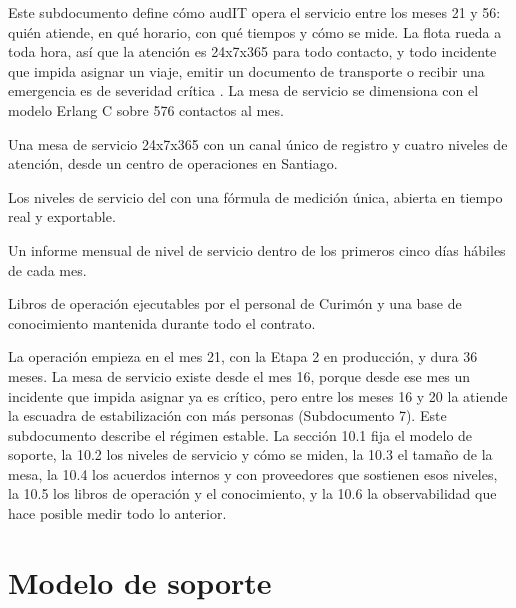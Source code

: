 
\begin{resumenApertura}
Este subdocumento define cómo audIT opera el servicio entre los meses 21 y 56: quién atiende, en qué
horario, con qué tiempos y cómo se mide. La flota rueda a toda hora, así que la atención es 24x7x365
para todo contacto, y todo incidente que impida asignar un viaje, emitir un documento de transporte o
recibir una emergencia es de severidad crítica . La mesa de servicio se dimensiona
con el modelo Erlang C sobre 576 contactos al mes.
\begin{recibe}
  \item Una mesa de servicio 24x7x365 con un canal único de registro y cuatro niveles de atención, desde un centro de operaciones en Santiago.
  \item Los niveles de servicio del  con una fórmula de medición única, abierta en tiempo real y exportable.
  \item Un informe mensual de nivel de servicio dentro de los primeros cinco días hábiles de cada mes.
  \item Libros de operación ejecutables por el personal de Curimón y una base de conocimiento mantenida durante todo el contrato.
\end{recibe}
\end{resumenApertura}

La operación empieza en el mes 21, con la Etapa 2 en producción, y dura 36 meses. La mesa de servicio
existe desde el mes 16, porque desde ese mes un incidente que impida asignar ya es crítico, pero entre
los meses 16 y 20 la atiende la escuadra de estabilización con más personas (Subdocumento 7). Este
subdocumento describe el régimen estable. La sección 10.1 fija el modelo de soporte, la 10.2 los
niveles de servicio y cómo se miden, la 10.3 el tamaño de la mesa, la 10.4 los acuerdos internos y con
proveedores que sostienen esos niveles, la 10.5 los libros de operación y el conocimiento, y la 10.6 la
observabilidad que hace posible medir todo lo anterior.

\section{Modelo de soporte}\label{sec:10-modelo-de-soporte}

